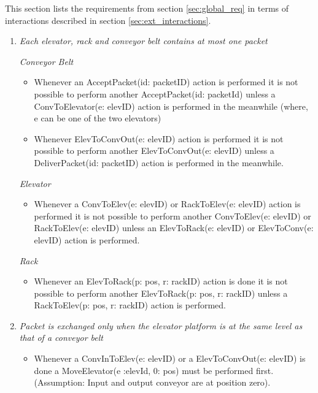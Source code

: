 
This section lists the requirements from section \ref{sec:global_req} in terms of interactions described in section \ref{sec:ext_interactions}.

\begin{enumerate}
\item \textit{Each elevator, rack and conveyor belt contains at most one packet}

	\textit{Conveyor Belt}
	\begin{itemize}
	\item
	Whenever an AcceptPacket(id: packetID) action is performed it
	is not possible to perform another AcceptPacket(id:
	packetId) unless a ConvToElevator(e: elevID) action is
	performed in the meanwhile (where, e can be one of the two elevators)
	\item Whenever ElevToConvOut(e: elevID) action is performed it is
	not possible to perform another ElevToConvOut(e: 
	elevID) unless a DeliverPacket(id: packetID) action is performed in the meanwhile.
	\end{itemize}
	\textit{Elevator}
	\begin{itemize}
	\item Whenever a ConvToElev(e: elevID) or RackToElev(e: elevID) 
	action is performed it is not possible to perform another
	ConvToElev(e: elevID) or RackToElev(e: elevID) unless an 
	ElevToRack(e: elevID) or ElevToConv(e: elevID) action is performed.
	\end{itemize}
	
	\textit{Rack}
	\begin{itemize}
	\item Whenever an ElevToRack(p: pos, r: rackID) action is done it is not
	possible to perform another ElevToRack(p: pos, r: rackID) unless a RackToElev(p: pos, r: rackID) action is performed.
	\end{itemize}

\item \textit{ Packet is exchanged only when the elevator platform is at
the same level as that of a conveyor belt}
	\begin{itemize}
	\item Whenever a ConvInToElev(e: elevID) or a ElevToConvOut(e: 
	elevID) is done a MoveElevator(e :elevId, 0: pos) must be
	performed first.(Assumption: Input and output conveyor are at
	position zero).	
	\end{itemize}


\end{enumerate}
